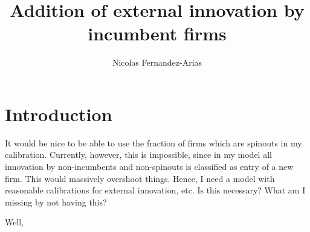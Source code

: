 \documentclass[12pt,english]{article}
\theoremstyle{remark}
\begin{document}
	
\title{Addition of external innovation by incumbent firms}
\author{Nicolas Fernandez-Arias}
\maketitle

\section{Introduction}

It would be nice to be able to use the fraction of firms which are spinouts in my calibration. Currently, however, this is impossible, since in my model all innovation by non-incumbents and non-spinouts is classified as entry of a new firm. This would massively overshoot things. Hence, I need a model with reasonable calibrations for external innovation, etc. Is this necessary? What am I missing by not having this?

Well, 
\end{document}
